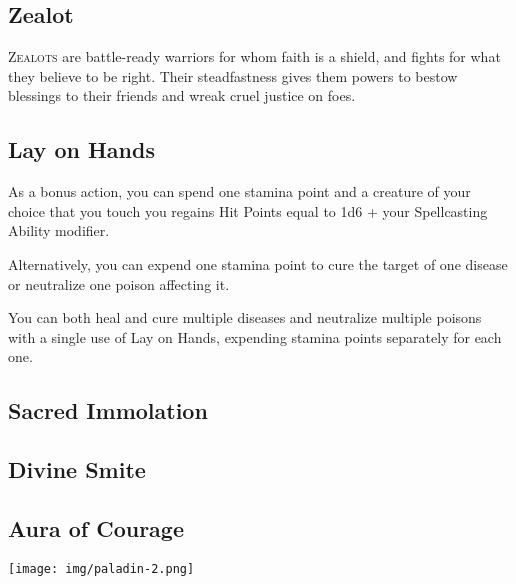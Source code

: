 
\begin{multicols*}{2}

\section{Zealot}

\lettrine[lines=3, lhang=0.15, loversize=0.25, findent=.5em]{Z}{ealots} are battle-ready warriors for whom faith is a shield, and fights for what they believe to be right. Their steadfastness gives them powers to bestow blessings to their friends and wreak cruel justice on foes.

\subsection*{Lay on Hands}

As a bonus action, you can spend one stamina point and a creature of your choice that you touch you regains Hit Points equal to 1d6 + your Spellcasting Ability modifier.

Alternatively, you can expend one stamina point to cure the target of one disease or neutralize one poison affecting it.

You can both heal and cure multiple diseases and neutralize multiple poisons with a single use of Lay on Hands, expending stamina points separately for each one.


\subsection*{Sacred Immolation}

\subsection*{Divine Smite}

\subsection*{Aura of Courage}

\begin{Figure}
\centering
\texttt{[image: img/paladin-2.png]}
\end{Figure}
    
\end{multicols*}

    
